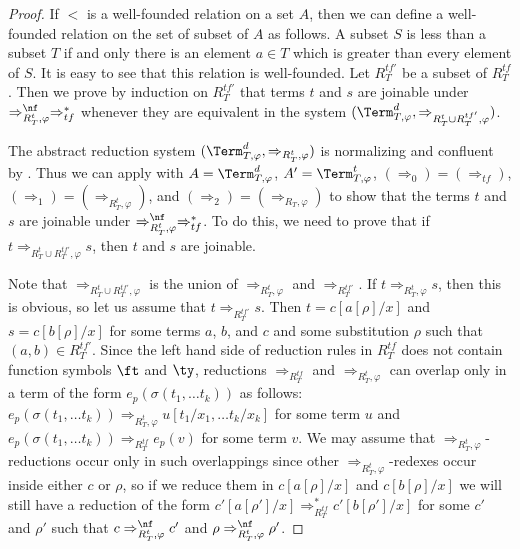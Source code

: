 \begin{proof}
If $<$ is a well-founded relation on a set $A$, then we can define a well-founded relation on the set of subset of $A$ as follows.
A subset $S$ is less than a subset $T$ if and only there is an element $a \in T$ which is greater than every element of $S$.
It is easy to see that this relation is well-founded.
Let $R^{tf'}_T$ be a subset of $R^{tf}_T$.
Then we prove by induction on $R^{tf'}_T$ that terms $t$ and $s$ are joinable under $\Rightarrow_{R_T^t,\varphi}^\nf \Rightarrow_{tf}^*$
whenever they are equivalent in the system $(\Term_{T,\varphi}^d,\Rightarrow_{R^t_T \cup R^{tf'}_T, \varphi})$.

The abstract reduction system $(\Term_{T,\varphi}^d,\Rightarrow_{R^t_T,\varphi})$ is normalizing and confluent by .
Thus we can apply  with $A = \Term^d_{T,\varphi}$, $A' = \Term^t_{T,\varphi}$, $(\Rightarrow_0) = (\Rightarrow_{tf})$, $(\Rightarrow_1) = (\Rightarrow_{R^t_T,\varphi})$, and $(\Rightarrow_2) = (\Rightarrow_{R_T,\varphi})$
to show that the terms $t$ and $s$ are joinable under $\Rightarrow_{R_T^t,\varphi}^\nf \Rightarrow_{tf}^*$.
To do this, we need to prove that if $t \Rightarrow_{R^t_T \cup R^{tf'}_T, \varphi} s$, then $t$ and $s$ are joinable.

Note that $\Rightarrow_{R^t_T \cup R^{tf'}_T, \varphi}$ is the union of $\Rightarrow_{R^t_T,\varphi}$ and $\Rightarrow_{R^{tf'}_T}$.
If $t \Rightarrow_{R^t_T,\varphi} s$, then this is obvious, so let us assume that $t \Rightarrow_{R^{tf'}_T} s$.
Then $t = c[a[\rho]/x]$ and $s = c[b[\rho]/x]$ for some terms $a$, $b$, and $c$ and some substitution $\rho$ such that $(a,b) \in R^{tf'}_T$.
Since the left hand side of reduction rules in $R_T^{tf}$ does not contain function symbols $\ft$ and $\ty$,
reductions $\Rightarrow_{R_T^{tf}}$ and $\Rightarrow_{R_T^t,\varphi}$ can overlap only in a term of the form $e_p(\sigma(t_1, \ldots t_k))$ as follows:
$e_p(\sigma(t_1, \ldots t_k)) \Rightarrow_{R_T^t,\varphi} u[t_1/x_1, \ldots t_k/x_k]$ for some term $u$ and $e_p(\sigma(t_1, \ldots t_k)) \Rightarrow_{R_T^{tf}} e_p(v)$ for some term $v$.
We may assume that $\Rightarrow_{R_T^t,\varphi}$-reductions occur only in such overlappings since other $\Rightarrow_{R_T^t,\varphi}$-redexes occur inside either $c$ or $\rho$, so if we reduce them in $c[a[\rho]/x]$ and $c[b[\rho]/x]$
we will still have a reduction of the form $c'[a[\rho']/x] \Rightarrow_{R_T^{tf}}^* c'[b[\rho']/x]$ for some $c'$ and $\rho'$ such that $c \Rightarrow_{R_T^t,\varphi}^\nf c'$ and $\rho \Rightarrow_{R_T^t,\varphi}^\nf \rho'$.


\end{proof}

